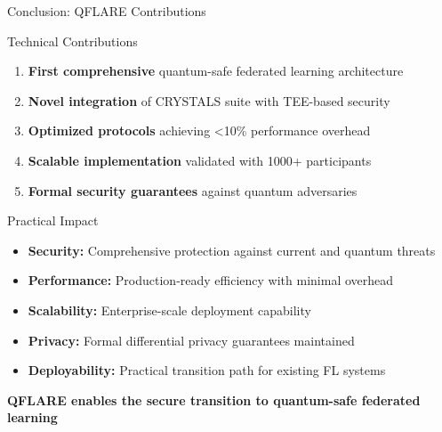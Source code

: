 \documentclass[aspectratio=169,11pt]{beamer}
\newcommand{\highlight}[1]{\textcolor{qflareblue}{\textbf{#1}}}
\begin{document}
\begin{frame}{Conclusion: QFLARE Contributions}

\begin{block}{Technical Contributions}
\begin{enumerate}
\item \highlight{First comprehensive} quantum-safe federated learning architecture
\item \highlight{Novel integration} of CRYSTALS suite with TEE-based security
\item \highlight{Optimized protocols} achieving <10\% performance overhead
\item \highlight{Scalable implementation} validated with 1000+ participants
\item \highlight{Formal security guarantees} against quantum adversaries
\end{enumerate}
\end{block}

\begin{block}{Practical Impact}
\begin{itemize}
\item \textbf{Security:} Comprehensive protection against current and quantum threats
\item \textbf{Performance:} Production-ready efficiency with minimal overhead
\item \textbf{Scalability:} Enterprise-scale deployment capability
\item \textbf{Privacy:} Formal differential privacy guarantees maintained
\item \textbf{Deployability:} Practical transition path for existing FL systems
\end{itemize}
\end{block}

\begin{center}
\Large{\highlight{QFLARE enables the secure transition to quantum-safe federated learning}}
\end{center}

\end{frame}

\end{document}
